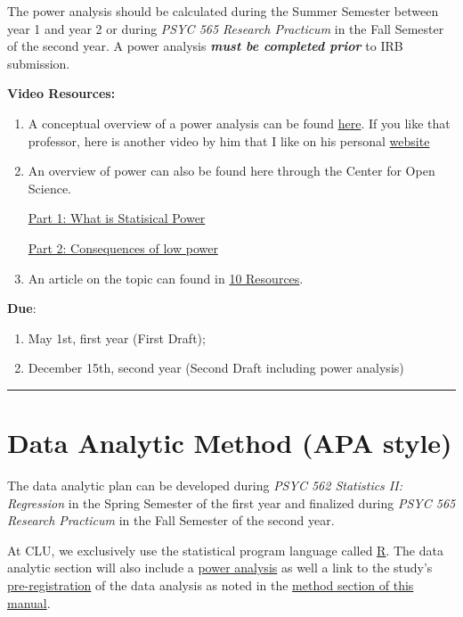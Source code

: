 \documentclass[
  openany]{book}
\providecommand{\tightlist}{%
  \setlength{\itemsep}{0pt}\setlength{\parskip}{0pt}}
\begin{document}
The power analysis should be calculated during the Summer Semester between year 1 and year 2 or during \emph{PSYC 565 Research Practicum} in the Fall Semester of the second year. A power analysis \textbf{\emph{must be completed prior}} to IRB submission.

\textbf{Video Resources:}

\begin{enumerate}
\def\labelenumi{\arabic{enumi}.}
\item
  A conceptual overview of a power analysis can be found \href{https://www.youtube.com/watch?v=Lr-i4Ugoc5M}{here}. If you like that professor, here is another video by him that I like on his personal \href{https://www.youtube.com/watch?v=XhfkodpyIsw}{website}
\item
  An overview of power can also be found here through the Center for Open Science.

  \href{https://www.youtube.com/watch?v=-ZU7fbvSJ60}{Part 1: What is Statisical Power}

  \href{https://www.youtube.com/watch?v=7daQRvRO-NE}{Part 2: Consequences of low power}
\item
  An article on the topic can found in \protect\hyperlink{resources}{10 Resources}.
\end{enumerate}

\textbf{Due}:

\begin{enumerate}
\def\labelenumi{\arabic{enumi}.}
\tightlist
\item
  May 1st, first year (First Draft);
\item
  December 15th, second year (Second Draft including power analysis)
\end{enumerate}

\begin{center}\rule{0.5\linewidth}{0.5pt}\end{center}

\hypertarget{data-analytic-method-apa-style}{%
\section{Data Analytic Method (APA style)}\label{data-analytic-method-apa-style}}

The data analytic plan can be developed during \emph{PSYC 562 Statistics II: Regression} in the Spring Semester of the first year and finalized during \emph{PSYC 565 Research Practicum} in the Fall Semester of the second year.

At CLU, we exclusively use the statistical program language called \href{https://www.r-project.org/}{R}. The data analytic section will also include a \protect\hyperlink{method}{power analysis} as well a link to the study's \href{https://aspredicted.org/}{pre-registration} of the data analysis as noted in the \protect\hyperlink{method}{method section of this manual}.
\end{document}

